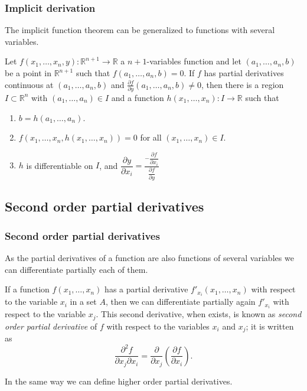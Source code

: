 \begin{frame}
\frametitle{Implicit derivation}
The implicit function theorem can be generalized to functions with several variables.

\begin{theorem}
Let $f(x_1,\ldots,x_n,y):\mathbb{R}^{n+1}\longrightarrow \mathbb{R}$ a $n+1$-variables function and let $(a_1,\ldots, a_n,b)$ be a point in $\mathbb{R}^{n+1}$ such that $f(a_1,\ldots,a_n,b)=0$.
If $f$ has partial derivatives continuous at $(a_1,\ldots,a_n,b)$ and $\frac{\partial f}{\partial y}(a_1,\ldots,a_n,b)\neq 0$, then there is a region $I\subset \mathbb{R}^n$ with $(a_1,\ldots,a_n)\in I$ and a function $h(x_1,\ldots, x_n): I\longrightarrow \mathbb{R}$ such that
\begin{enumerate}
\item $b=h(a_1,\ldots,a_n)$.
\item $f(x_1,\ldots,x_n,h(x_1,\ldots,x_n))=0$ for all $(x_1,\ldots,x_n)\in I$.
\item $h$ is differentiable on $I$, and $\dfrac{\partial y}{\partial x_i}=\frac{-\dfrac{\partial f}{\partial x_i}}{\dfrac{\partial f}{\partial y}}$
\end{enumerate}
\end{theorem}
\end{frame}



\subsection{Second order partial derivatives}
\begin{frame}
\frametitle{Second order partial derivatives}
As the partial derivatives of a function are also functions of several variables we can differentiate partially each of them.

If a function $f(x_1,\ldots,x_n)$ has a partial derivative $f'_{x_i}(x_1,\ldots,x_n)$ with respect to the variable $x_i$ in a set $A$, then we can differentiate partially again $f'_{x_i}$ with respect to the variable $x_j$.
This second derivative, when exists, is known as \emph{second order partial derivative} of $f$ with respect to the variables $x_i$ and $x_j$; it is written as
\[
\frac{\partial ^2 f}{\partial x_j \partial x_i}= \frac{\partial}{\partial x_j}\left(\frac{\partial f}{\partial x_i}\right).
\]

In the same way we can define higher order partial derivatives.
\end{frame}


